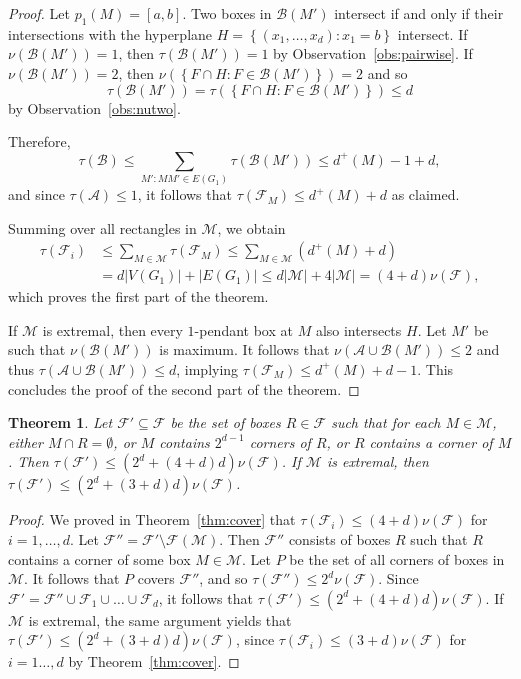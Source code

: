 \documentclass[12pt]{amsart}
\theoremstyle{plain}
\newtheorem{theorem}{Theorem}[section]
\theoremstyle{definition}
\theoremstyle{remark}
\newcommand{\F}{\mathcal{F}}
\newcommand{\M}{\mathcal{M}}
\newcommand{\sset}[1]{\left\{#1\right\}}
\begin{document}
\begin{proof}
Let $p_1(M) = [a,b]$. Two boxes in $\mathcal{B}(M')$ intersect if and only if their intersections with the hyperplane $H = \sset{(x_1, \dots, x_d) : x_1 = b}$ intersect. If $\nu(\mathcal{B}(M')) = 1$, then $\tau(\mathcal{B}(M')) = 1$ by Observation~\ref{obs:pairwise}. If $\nu(\mathcal{B}(M')) = 2$, then $\nu(\sset{F \cap H : F \in \mathcal{B}(M')}) = 2$ and so $$\tau(\mathcal{B}(M')) = \tau(\sset{F \cap H : F \in \mathcal{B}(M')}) \leq d$$ by Observation~\ref{obs:nutwo}. 

Therefore, $$\tau(\mathcal{B}) \leq \sum_{M': MM' \in E(G_1)} \tau(\mathcal{B}(M')) \leq d^+(M) - 1 + d,$$ and since $\tau(\mathcal{A}) \leq 1$, it follows that $\tau(\F_M) \leq d^+(M) + d$ as claimed.  

Summing over all rectangles in $\M$, we obtain
\begin{align*}
\tau(\F_i) &\leq \sum_{M \in \M} \tau(\F_M) \leq \sum_{M \in \M} (d^+(M) + d) \\
&= d|V(G_1)| + |E(G_1)|\leq d|\M| + 4|\M| = (4+d)\nu(\F),
\end{align*}
which proves the first part of the theorem.

If $\M$ is extremal, then every $1$-pendant box at $M$ also intersects $H$. Let $M'$ be such that $\nu(\mathcal{B}(M'))$ is maximum. It follows that $\nu(\mathcal{A} \cup \mathcal{B}(M')) \leq 2$ and thus $\tau(\mathcal{A} \cup \mathcal{B}(M')) \leq d$, implying  $\tau(\F_M) \leq d^+(M) + d -1$. 
This concludes the proof of the second part of the theorem.
\end{proof}

\begin{theorem} \label{maintechnical}  Let $\F' \subseteq \F$ be the set of boxes $R \in \F$ such that for each $M \in \M$, either $M \cap R = \emptyset$, or $M$ contains $2^{d-1}$ corners of $R$, or $R$ contains a corner of $M$. Then $\tau(\F') \leq  (2^d+(4+d)d)   \nu(\F)$. If $\M$ is extremal, then  $\tau(\F') \leq  (2^d+(3+d)d)   \nu(\F)$.
\end{theorem}
\begin{proof}
We proved in Theorem~\ref{thm:cover} that $\tau(\F_i) \leq (4+d)\nu(\F)$ for $i=1,\dots,d$. Let $\mathcal{F}'' = \F' \setminus \F(\M)$. Then $\F''$ consists of boxes $R$ such that $R$ contains a corner of some box $M \in \M$. Let $P$ be the set of all corners of boxes in $\M$. It follows that $P$ covers $\F''$, and so $\tau(\F'') \leq 2^d\nu(\F)$. Since $\F' = \F'' \cup \F_1 \cup \dots \cup \F_d$, it follows that $\tau(\F') \leq (2^d+(4+d)d)  \nu(\F)$. If $\M$ is extremal, the same argument yields that $\tau(\F') \leq (2^d+(3+d)d)  \nu(\F)$, since $\tau(\F_i) \leq (3+d)\nu(\F)$ for $i = 1\dots, d$ by Theorem~\ref{thm:cover}. 
\end{proof}
\end{document}
